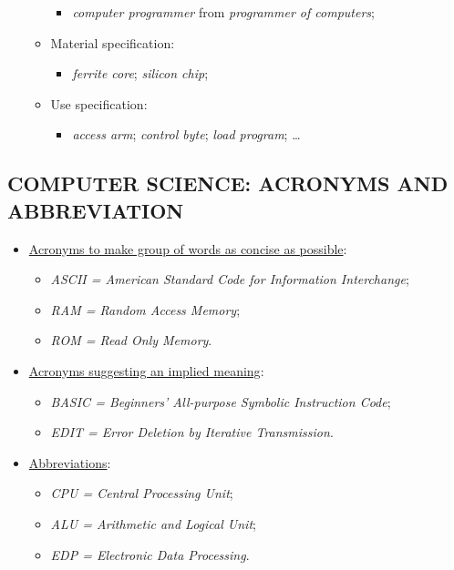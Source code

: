 \begin{itemize}
\begin{itemize}
\begin{itemize}
\item \textit{computer programmer} from \textit{programmer of computers};
\end{itemize}

\item Material specification:
\begin{itemize}
\item \textit{ferrite core}; \textit{silicon chip};
\end{itemize}

\item Use specification:
\begin{itemize}
\item \textit{access arm}; \textit{control byte}; \textit{load program}; … 
\end{itemize}

\end{itemize}

\end{itemize}

\subsection{COMPUTER SCIENCE: ACRONYMS AND ABBREVIATION}

\begin{itemize}

\item \underline{Acronyms to make group of words as concise as possible}:
\begin{itemize}

\item \textit{ASCII = American Standard Code for Information Interchange};
\item \textit{RAM = Random Access Memory};
\item \textit{ROM = Read Only Memory}.
\end{itemize}

\item \underline{Acronyms suggesting an implied meaning}:

\begin{itemize}

\item \textit{BASIC = Beginners’ All-purpose Symbolic Instruction Code};
\item \textit{EDIT = Error Deletion by Iterative Transmission}.
\end{itemize}

\item \underline{Abbreviations}:

\begin{itemize}

\item \textit{CPU = Central Processing Unit};
\item \textit{ALU = Arithmetic and Logical Unit};
\item \textit{EDP = Electronic Data Processing}.
\end{itemize}

\end{itemize}

